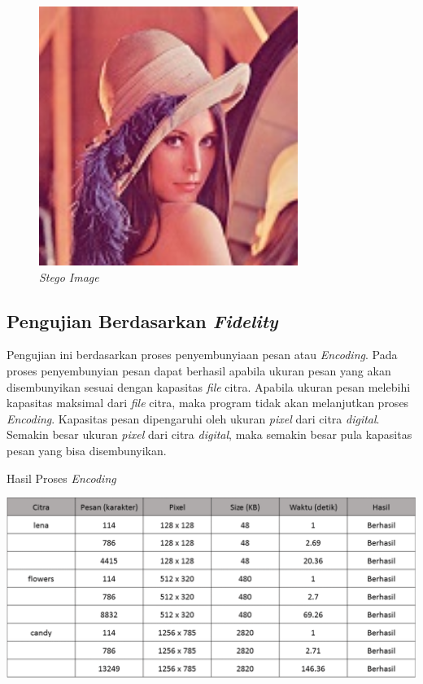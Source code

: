 	\begin{figure}[H]
		\centering
		\includegraphics[width=0.75\textwidth]{gambar/matlab/lena_kalimat}
		\caption{\emph{Stego Image}}
		\label{lena_pesan}
	\end{figure}

	\subsection{Pengujian Berdasarkan \emph{Fidelity}}
	Pengujian ini berdasarkan proses penyembunyiaan pesan atau \emph{Encoding}. Pada proses penyembunyian pesan dapat berhasil apabila ukuran pesan yang akan disembunyikan sesuai dengan kapasitas \emph{file} citra. Apabila ukuran pesan melebihi kapasitas maksimal dari \emph{file} citra, maka program tidak akan melanjutkan proses \emph{Encoding}. Kapasitas pesan dipengaruhi oleh ukuran \emph{pixel} dari citra \emph{digital}. Semakin besar ukuran \emph{pixel} dari citra \emph{digital}, maka semakin besar pula kapasitas pesan yang bisa disembunyikan.
	
	\begin{table}[H]
		\centering
		\caption{Hasil Proses \emph{Encoding}}
		\includegraphics[width=1.0\textwidth]{gambar/table_hasilencode}
		\label{tabel_hasilencode2}
	\end{table}
	
